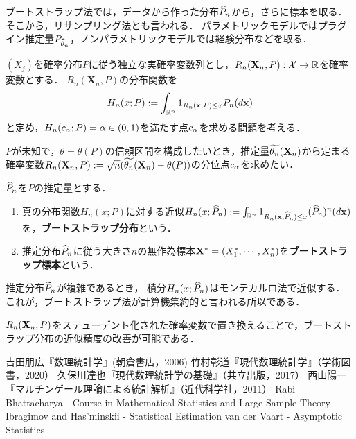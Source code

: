 \documentclass[uplatex,dvipdfmx]{jsreport}
\begin{document}
\begin{tcolorbox}[colframe=ForestGreen, colback=ForestGreen!10!white,breakable,colbacktitle=ForestGreen!40!white,coltitle=black,fonttitle=\bfseries\sffamily,
title=]
    ブートストラップ法では，データから作った分布$\widehat{P}_n$から，さらに標本を取る．そこから，リサンプリング法とも言われる．
    パラメトリックモデルではプラグイン推定量$P_{\widehat{\theta}_n}$，ノンパラメトリックモデルでは経験分布などを取る．
\end{tcolorbox}

\begin{notation}
    $(X_j)$を確率分布$P$に従う独立な実確率変数列とし，$R_n(\mathbf{X}_n,P):\mathcal{X}\to\mathbb{R}$を確率変数とする．
    $R_n(\mathbf{X}_n,P)$の分布関数を
    \[H_n(x;P):=\int_{\mathbb{R}^n}1_{R_n(\mathbf{x},P)\le x}P_n(d\mathbf{x})\]
    と定め，$H_n(c_\alpha;P)=\alpha\in(0,1)$を満たす点$c_\alpha$を求める問題を考える．
\end{notation}
\begin{example}
    $P$が未知で，$\theta=\theta(P)$の信頼区間を構成したいとき，推定量$\widetilde{\theta_n}(\mathbf{X}_n)$から定まる確率変数$R_n(\mathbf{X}_n,P):=\sqrt{n}(\widetilde{\theta_n}(\mathbf{X}_n)-\theta(P))$の分位点$c_\alpha$を求めたい．
\end{example}

\begin{definition}
    $\widehat{P}_n$を$P$の推定量とする．
    \begin{enumerate}
        \item 真の分布関数$H_n(x;P)$に対する近似$H_n(x;\widehat{P}_n):=\int_{\mathbb{R}^n}1_{R_n(\mathbf{x},\widehat{P}_n)\le x}(\widehat{P}_n)^n(d\mathbf{x})$を，\textbf{ブートストラップ分布}という．
        \item 推定分布$\widehat{P}_n$に従う大きさ$n$の無作為標本$\mathbf{X}^*=(X^*_1,\cdots,X^*_n)$を\textbf{ブートストラップ標本}という．
    \end{enumerate}
\end{definition}
\begin{remark}
    推定分布$\widetilde{P}_n$が複雑であるとき，
    積分$H_n(x;\widehat{P}_n)$はモンテカルロ法で近似する．
    これが，ブートストラップ法が計算機集約的と言われる所以である．
\end{remark}
\begin{remark}[studentization]
    $R_n(\mathbf{X}_n,P)$をステューデント化された確率変数で置き換えることで，ブートストラップ分布の近似精度の改善が可能である．
\end{remark}

\begin{thebibliography}{99}
    吉田朋広『数理統計学』(朝倉書店，2006)
    竹村彰道『現代数理統計学』（学術図書，2020）
    久保川達也『現代数理統計学の基礎』（共立出版，2017）
    西山陽一『マルチンゲール理論による統計解析』（近代科学社，2011）
    Rabi Bhattacharya - Course in Mathematical Statistics and Large Sample Theory
    Ibragimov and Has'minskii - Statistical Estimation
    van der Vaart - Asymptotic Statistics
\end{thebibliography}
\end{document}

